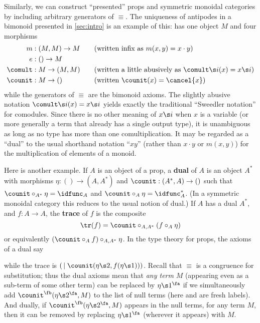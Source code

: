 \newpage

Similarly, we can construct ``presented'' props and symmetric monoidal categories by including arbitrary generators of $\equiv$.
The uniqueness of antipodes in a bimonoid presented in \cref{sec:intro} is an example of this: \cG has one object $M$ and four morphisms
\begin{alignat*}{2}
m&:(M,M)\to M &&\quad\text{(written infix as $m(x,y) = x\cdot y$)}\\
e&:()\to M\\
\comult&:M\to (M,M) &&\quad\text{(written a little abusively as $\comult\s i(x) = x\s i$)}\\
\counit &:M\to () &&\quad\text{(written $\counit(x) = \cancel{x}$)}
\end{alignat*}
while the generators of $\equiv$ are the bimonoid axioms.
The slightly abusive notation $\comult\s i(x) = x\s i$ yields exactly the traditional ``Sweedler notation'' for comodules.
Since there is no other meaning of $x\s i$ when $x$ is a variable (or more generally a term that already has a single output type), it is unambiguous as long as no type has more than one comultiplication.
It may be regarded as a ``dual'' to the usual shorthand notation ``$x y$'' (rather than $x\cdot y$ or $m(x,y)$) for the multiplication of elements of a monoid.

Here is another example.
If $A$ is an object of a prop, a \textbf{dual} of $A$ is an object $A^*$ with morphisms $\eta:()\to (A,A^*)$ and $\counit:(A^*,A)\to ()$ such that $\counit \circ_{A^*} \eta = \idfunc_A$ and $\counit \circ_{A} \eta = \idfunc_A^*$.
(In a symmetric monoidal category this reduces to the usual notion of dual.)
If $A$ has a dual $A^*$, and $f:A\to A$, the \textbf{trace} of $f$ is the composite
\[ \tr(f) = \counit \circ_{A,A^*} (f \circ_A \eta) \]
or equivalently $(\counit \circ_A f)\circ_{A,A^*} \eta$.
In the type theory for props, the axioms of a dual say
while the trace is $(\,\mid \counit(\eta\s2,f(\eta\s1)))$.
Recall that $\equiv$ is a congruence for substitution; thus the dual axioms mean that \emph{any term} $M$ (appearing even as a sub-term of some other term) can be replaced by $\eta\s1^\fa$ if we simultaneously add $\counit^\fb(\eta\s2^\fa,M)$ to the list of null terms (here \fa and \fb are fresh labels).
And dually, if $\counit^\fb(\eta\s2^\fa,M)$ appears in the null terms, for any term $M$, then it can be removed by replacing $\eta\s1^\fa$ (wherever it appears) with $M$.

